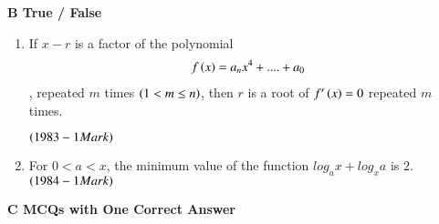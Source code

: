 \documentclass[journal,12pt,twocolumn]{IEEEtran}
\theoremstyle{remark}
\begin{document}
\textbf{B True / False}\\

\begin{enumerate}

	\item If $x-r$ is a factor of the polynomial
		\begin{align*}f\left(x\right) = a_nx^4+....+a_0\end{align*},
repeated $m$ times $\left(1< m\leq n\right)$, then $r$ is a root of 
$f'\left(x\right)=0$ repeated $m$ times.

\hfill$\left(1983 - 1 Mark\right)$\\

         \item For $0 < a < x$, the minimum value of the function 
$log_a x + log_x a$ is $2$. \hfill$\left(1984 - 1 Mark\right)$\\

\end{enumerate}

\textbf{C MCQs with One Correct Answer}\\
\end{document}

